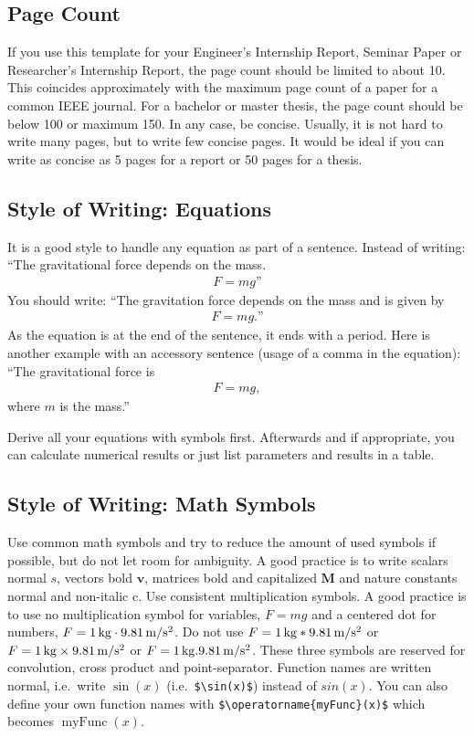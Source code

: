 \documentclass[journal]{IEEEtran}
\renewcommand{\c}{\mathrm} %
\newcommand{\M}{\boldsymbol} %
\renewcommand{\v}{\boldsymbol} %
\begin{document}
\subsection{Page Count}

If you use this template for your Engineer's Internship Report, Seminar Paper or Researcher's Internship Report, the page count should be limited to about 10. This coincides approximately with the maximum page count of a paper for a common IEEE journal. For a bachelor or master thesis, the page count should be below 100 or maximum 150. In any case, be concise. Usually, it is not hard to write many pages, but to write few concise pages. It would be ideal if you can write as concise as 5 pages for a report or 50 pages for a thesis.

\subsection{Style of Writing: Equations}

It is a good style to handle any equation as part of a sentence. Instead of writing: “The gravitational force depends on the mass.
\begin{align}
	F = m g”
\end{align}
You should write: “The gravitation force depends on the mass and is given by
\begin{align}
	F = m g.”
\end{align}
As the equation is at the end of the sentence, it ends with a period. Here is another example with an accessory sentence (usage of a comma in the equation): “The gravitational force is
\begin{align}
	F = m g,
\end{align}
where $m$ is the mass.”

Derive all your equations with symbols first. Afterwards and if appropriate, you can calculate numerical results or just list parameters and results in a table.

\subsection{Style of Writing: Math Symbols}

Use common math symbols and try to reduce the amount of used symbols if possible, but do not let room for ambiguity. A good practice is to write scalars normal $s$, vectors bold $\v{v}$, matrices bold and capitalized $\M{M}$ and nature constants normal and non-italic $\c{c}$. Use consistent multiplication symbols. A good practice is to use no multiplication symbol for variables, $F = mg$ and a centered dot for numbers, $F = \unit[1]{kg} \cdot \unit[9.81]{m/s^2}$. Do not use $F = \unit[1]{kg} * \unit[9.81]{m/s^2}$ or $F = \unit[1]{kg} \times \unit[9.81]{m/s^2}$ or $F = \unit[1]{kg} . \unit[9.81]{m/s^2}$. These three symbols are reserved for convolution, cross product and point-separator. Function names are written normal, i.e.\ write $\sin(x)$ (i.e.\ \texttt{\$\textbackslash{}sin(x)\$}) instead of $sin(x)$. You can also define your own function names with \texttt{\$\textbackslash{}operatorname\{myFunc\}(x)\$} which becomes $\operatorname{myFunc}(x)$.
\end{document}
